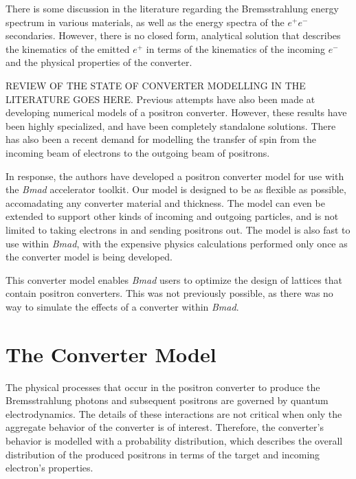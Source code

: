 \documentclass[letter,
               biblatex,     %
               keeplastbox,   %
               ]{jacow}
\newcommand{\bmad}{\textit{Bmad}}
\begin{document}
There is some discussion in the literature regarding the Bremsstrahlung energy spectrum in various materials, %
as well as the energy spectra of the $e^+ e^-$ secondaries. %
However, there is no closed form, analytical solution that describes the kinematics of the emitted $e^+$ in terms of the kinematics of the incoming $e^-$ and the physical properties of the converter.

REVIEW OF THE STATE OF CONVERTER MODELLING IN THE LITERATURE GOES HERE.
Previous attempts have also been made at developing numerical models of a positron converter. %
However, these results have been highly specialized, and have been completely standalone solutions. %
There has also been a recent demand for modelling the transfer of spin from the incoming beam of electrons to the outgoing beam of positrons. %

In response, the authors have developed a positron converter model for use with the \bmad{} accelerator toolkit.
Our model is designed to be as flexible as possible, accomadating any converter material and thickness.
The model can even be extended to support other kinds of incoming and outgoing particles, and is not limited to taking electrons in and sending positrons out.
The model is also fast to use within \bmad{}, with the expensive physics calculations performed only once as the converter model is being developed. %

This converter model enables \bmad{} users to optimize the design of lattices that contain positron converters.
This was not previously possible, as there was no way to simulate the effects of a converter within \bmad{}. %


\section{The Converter Model}

The physical processes that occur in the positron converter to produce the Bremsstrahlung photons and subsequent positrons are governed by quantum electrodynamics. %
The details of these interactions are not critical when only the aggregate behavior of the converter is of interest.
Therefore, the converter's behavior is modelled with a probability distribution, which describes the overall distribution of the produced positrons in terms of the target and incoming electron's properties. %
\end{document}

